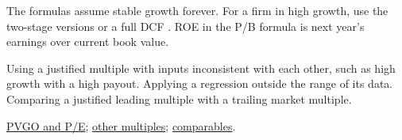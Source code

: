 \begin{qfmethod}
 The formulas assume stable growth forever. For a firm in high growth, use the two-stage versions or a full DCF \citep[pp.~471--473]{investment-valuation-2012}. ROE in the P/B formula is next year's earnings over current book value.

 Using a justified multiple with inputs inconsistent with each other, such as high growth with a high payout. Applying a regression outside the range of its data. Comparing a justified leading multiple with a trailing market multiple.

 \hyperref[meth:pvgo-justified-pe]{PVGO and P/E}; \hyperref[meth:alternative-multiples]{other multiples}; \hyperref[meth:comparables-evaluation]{comparables}.

\end{qfmethod}

